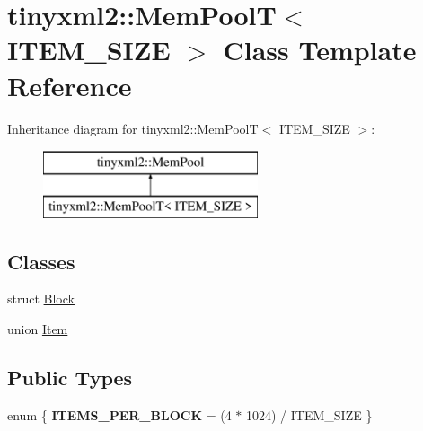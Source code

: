 \hypertarget{classtinyxml2_1_1MemPoolT}{}\section{tinyxml2\+::Mem\+PoolT$<$ I\+T\+E\+M\+\_\+\+S\+I\+ZE $>$ Class Template Reference}
\label{classtinyxml2_1_1MemPoolT}
Inheritance diagram for tinyxml2\+::Mem\+PoolT$<$ I\+T\+E\+M\+\_\+\+S\+I\+ZE $>$\+:\begin{figure}[H]
\begin{center}
\leavevmode
\includegraphics[height=2.000000cm]{classtinyxml2_1_1MemPoolT}
\end{center}
\end{figure}
\subsection*{Classes}
\begin{DoxyCompactItemize}
\item 
struct \mbox{\hyperlink{structtinyxml2_1_1MemPoolT_1_1Block}{Block}}
\item 
union \mbox{\hyperlink{uniontinyxml2_1_1MemPoolT_1_1Item}{Item}}
\end{DoxyCompactItemize}
\subsection*{Public Types}
\begin{DoxyCompactItemize}
\item 
\mbox{\label{classtinyxml2_1_1MemPoolT_a04cf45156e6f913f93972869ff8a1d94}} 
enum \{ {\bfseries I\+T\+E\+M\+S\+\_\+\+P\+E\+R\+\_\+\+B\+L\+O\+CK} = (4 $\ast$ 1024) / I\+T\+E\+M\+\_\+\+S\+I\+ZE
 \}
\end{DoxyCompactItemize}
